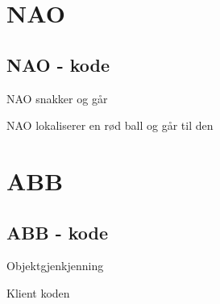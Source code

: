 \section{NAO}
\subsection{NAO - kode}
NAO snakker og går

NAO lokaliserer en rød ball og går til den


\section{ABB}
\subsection{ABB - kode}
Objektgjenkjenning

Klient koden

